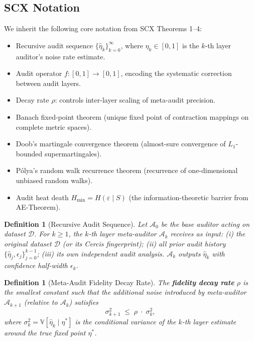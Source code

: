 \documentclass[12pt,a4paper]{article}
\newtheorem{definition}[theorem]{Definition}
\newcommand{\V}{\mathbb{V}}
\newcommand{\cD}{\mathcal{D}}
\newcommand{\cA}{\mathcal{A}}
\begin{document}
\subsection{SCX Notation}

We inherit the following core notation from \textsf{SCX} Theorems 1--4:
\begin{itemize}
    \item Recursive audit sequence $\{\hat{\eta}_k\}_{k=0}^\infty$, where $\hat{\eta}_k\in[0,1]$ is the $k$-th layer auditor's noise rate estimate.
    \item Audit operator $f:[0,1]\to[0,1]$, encoding the systematic correction between audit layers.
    \item Decay rate $\rho$: controls inter-layer scaling of meta-audit precision.
    \item Banach fixed-point theorem (unique fixed point of contraction mappings on complete metric spaces).
    \item Doob's martingale convergence theorem (almost-sure convergence of $L_1$-bounded supermartingales).
    \item P\'olya's random walk recurrence theorem (recurrence of one-dimensional unbiased random walks).
    \item Audit heat death $H_{\min}=H(\varepsilon\mid S)$ (the information-theoretic barrier from AE-Theorem).
\end{itemize}

\begin{definition}[Recursive Audit Sequence]
\label{def:recursive-seq}
Let $\cA_0$ be the base auditor acting on dataset $\cD$. For $k\geq1$, the $k$-th layer meta-auditor $\cA_k$ receives as input: (i) the original dataset $\cD$ (or its Cercis fingerprint); (ii) all prior audit history $\{\hat{\eta}_j,\epsilon_j\}_{j=0}^{k-1}$; (iii) its own independent audit analysis. $\cA_k$ outputs $\hat{\eta}_k$ with confidence half-width $\epsilon_k$.
\end{definition}

\begin{definition}[Meta-Audit Fidelity Decay Rate]
\label{def:rho}
The \textbf{fidelity decay rate} $\rho$ is the smallest constant such that the additional noise introduced by meta-auditor $\cA_{k+1}$ (relative to $\cA_k$) satisfies
\begin{equation}\label{eq:rho-def}
    \sigma_{k+1}^2 \;\leq\; \rho \;\cdot\; \sigma_k^2,
\end{equation}
where $\sigma_k^2 = \V[\hat{\eta}_k\mid\eta^*]$ is the conditional variance of the $k$-th layer estimate around the true fixed point $\eta^*$.
\end{definition}
\end{document}
